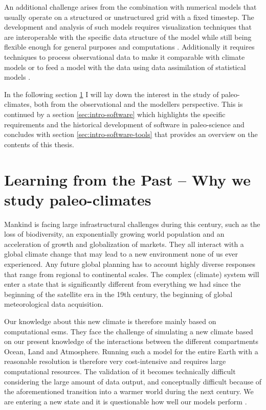 \begin{refsection}
An additional challenge arises from the combination with numerical models that usually operate on a structured \citep{Edwards2010,TreutSomervilleCubaschEtAl2007} or unstructured \addref[ICON] grid with a fixed timestep. The development and analysis of such models requires visualization techniques that are interoperable with the specific data structure of the model \citep[e.g.][]{RewDavis1990, BrownFolkGoucherEtAl1993} while still being flexible enough for general purposes and computations \citep{Sommer2017, HoyerHamman2017}. Additionally it requires techniques to process observational data to make it comparable with climate models \citep{MauriDavisCollinsEtAl2015}  or to feed a model with the data using data assimilation of statistical models \citep{SommerKaplan2017b}.

In the following section \ref{sec:intro-paleo} I will lay down the interest in the study of paleo-climates, both from the observational and the modellers perspective. This is continued by a section \ref{sec:intro-software} which highlights the specific requirements and the historical development of software in paleo-science and concludes with section \ref{sec:intro-software-tools} that provides an overview on the contents of this thesis.

\section{Learning from the Past – Why we study paleo-climates} \label{sec:intro-paleo}

Mankind is facing large infrastructural challenges during this century, such as the loss of biodiversity\addref, an exponentially growing world population \addref and an acceleration of growth and globalization of markets. They all interact with a global climate change that may lead to a new environment none of us ever experienced. Any future global planning has to account highly diverse responses that range from regional to continental scales. The complex (climate) system will enter a state that is significantly different from everything we had since the beginning of the satellite era in the 19th century, the beginning of global meteorological data acquisition\addref.

Our knowledge about this new climate is therefore mainly based on computational \glspl{esm}. They face the challenge of simulating a new climate based on our present knowledge of the interactions between the different compartments Ocean, Land and Atmosphere. Running such a model for the entire Earth with a reasonable resolution is therefore very cost-intensive and requires large computational resources. The validation of it becomes technically difficult considering the large amount of data output, and conceptually difficult because of the aforementioned transition into a warmer world during the next century. We are entering a new state and it is questionable how well our models perform \citep{UldenOldenborgh2006, Karpechko2010, HargreavesAnnanOhgaitoEtAl2013}.


\end{refsection}
